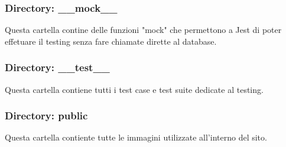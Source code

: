 \documentclass[11pt, a4paper]{article}
\theoremstyle{definition}
\begin{document}
\subsubsection{Directory: \_\_mock\_\_ }
Questa cartella contine delle funzioni "mock" che permettono a Jest di poter effetuare il testing senza fare chiamate dirette al database.
\subsubsection{Directory: \_\_test\_\_}
Questa cartella contiene tutti i test case e test suite dedicate al testing.
\subsubsection{Directory: public}
Questa cartella contiente tutte le immagini utilizzate all'interno del sito.
\end{document}
